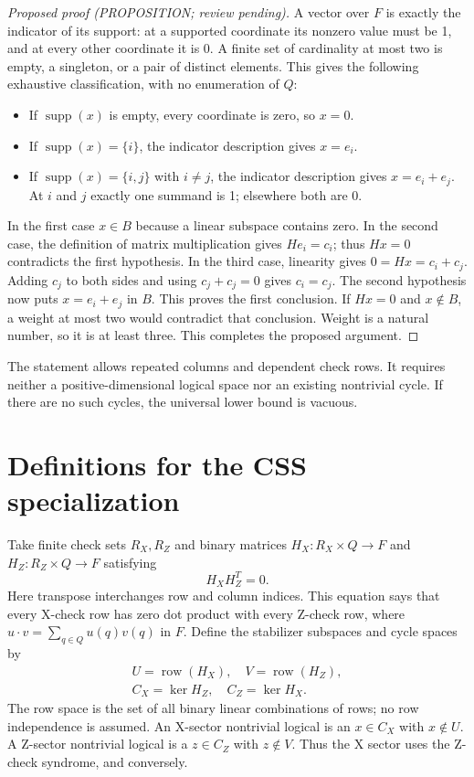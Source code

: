\documentclass{article}
\DeclareMathOperator{\supp}{supp}
\DeclareMathOperator{\row}{row}
\begin{document}
\begin{proof}[Proposed proof (PROPOSITION; review pending)]
  A vector over \(F\) is exactly the indicator of its support: at a supported coordinate
  its nonzero value must be 1, and at every other coordinate it is 0. A finite set of
  cardinality at most two is empty, a singleton, or a pair of distinct elements. This
  gives the following exhaustive classification, with no enumeration of \(Q\):
  \begin{itemize}
    \item If \(\supp(x)\) is empty, every coordinate is zero, so \(x = 0\).
    \item If \(\supp(x) = \{i\}\), the indicator description gives \(x = e_i\).
    \item If \(\supp(x) = \{i, j\}\) with \(i \ne j\), the indicator description gives
      \(x = e_i + e_j\). At \(i\) and \(j\) exactly one summand is 1; elsewhere both are 0.
  \end{itemize}
  In the first case \(x \in B\) because a linear subspace contains zero. In the second
  case, the definition of matrix multiplication gives \(He_i = c_i\); thus \(Hx = 0\)
  contradicts the first hypothesis. In the third case, linearity gives
  \(0 = Hx = c_i + c_j\). Adding \(c_j\) to both sides and using \(c_j + c_j = 0\) gives
  \(c_i = c_j\). The second hypothesis now puts \(x = e_i + e_j\) in \(B\). This proves the
  first conclusion. If \(Hx = 0\) and \(x \notin B\), a weight at most two would contradict
  that conclusion. Weight is a natural number, so it is at least three. This completes the
  proposed argument.
\end{proof}

The statement allows repeated columns and dependent check rows. It requires neither a
positive-dimensional logical space nor an existing nontrivial cycle. If there are no such
cycles, the universal lower bound is vacuous.

\section{Definitions for the CSS specialization}\label{sec:css-definitions}

Take finite check sets \(R_X, R_Z\) and binary matrices \(H_X \colon R_X \times Q \to F\)
and \(H_Z \colon R_Z \times Q \to F\) satisfying
\begin{equation}
  H_X H_Z^T = 0.
\end{equation}
Here transpose interchanges row and column indices. This equation says that every X-check
row has zero dot product with every Z-check row, where
\(u \cdot v = \sum_{q \in Q} u(q) v(q)\) in \(F\). Define the stabilizer subspaces and
cycle spaces by
\begin{gather}
  U = \row(H_X), \quad V = \row(H_Z), \\
  C_X = \ker H_Z, \quad C_Z = \ker H_X.
\end{gather}
The row space is the set of all binary linear combinations of rows; no row independence is
assumed. An X-sector nontrivial logical is an \(x \in C_X\) with \(x \notin U\). A Z-sector
nontrivial logical is a \(z \in C_Z\) with \(z \notin V\). Thus the X sector uses the
Z-check syndrome, and conversely.
\end{document}
